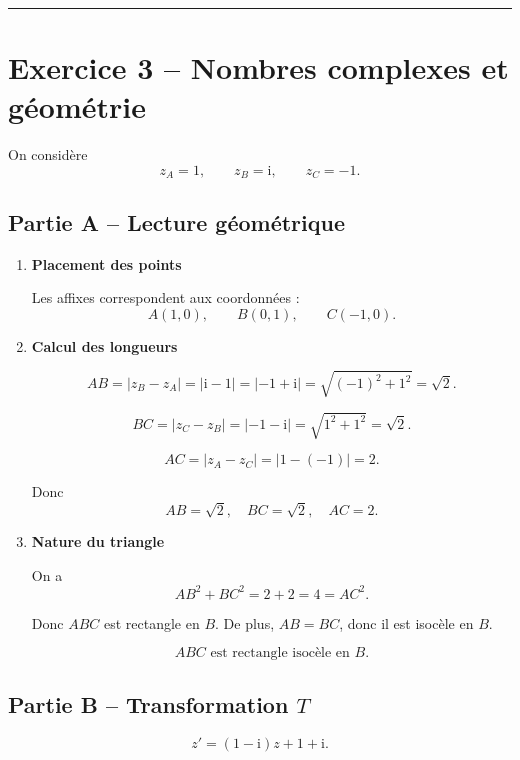 \documentclass[11pt,a4paper]{article}
\newcommand{\ii}{\mathrm{i}}
\begin{document}
\vspace{0.6em}
\hrule
\vspace{0.6em}

\section*{Exercice 3 -- Nombres complexes et géométrie}

On considère
\[
z_A=1,\qquad z_B=\ii,\qquad z_C=-1.
\]

\subsection*{Partie A -- Lecture géométrique}

\begin{enumerate}[label=\textbf{3.\arabic*}, leftmargin=1.6em]

\item \textbf{Placement des points}

Les affixes correspondent aux coordonnées :
\[
A(1,0),\qquad B(0,1),\qquad C(-1,0).
\]

\item \textbf{Calcul des longueurs}

\[
AB=|z_B-z_A|=|\ii-1|=|-1+\ii|=\sqrt{(-1)^2+1^2}=\sqrt2.
\]

\[
BC=|z_C-z_B|=|-1-\ii|=\sqrt{1^2+1^2}=\sqrt2.
\]

\[
AC=|z_A-z_C|=|1-(-1)|=2.
\]

Donc
\[
\boxed{AB=\sqrt2,\quad BC=\sqrt2,\quad AC=2.}
\]

\item \textbf{Nature du triangle}

On a
\[
AB^2+BC^2=2+2=4=AC^2.
\]

Donc \(ABC\) est rectangle en \(B\).  
De plus, \(AB=BC\), donc il est isocèle en \(B\).

\[
\boxed{ABC \text{ est rectangle isocèle en } B.}
\]

\end{enumerate}

\subsection*{Partie B -- Transformation \(T\)}

\[
z'=(1-\ii)z+1+\ii.
\]
\end{document}
